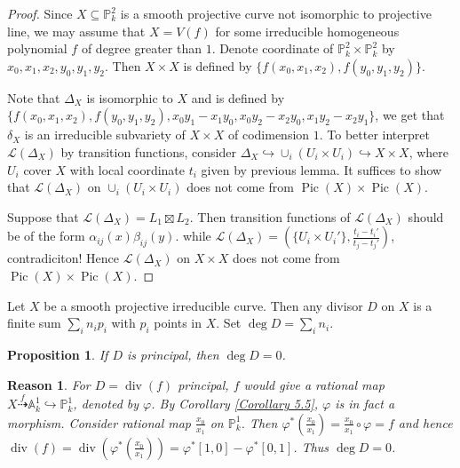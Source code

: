 \documentclass{ctexart}
\newtheorem{proposition}{Proposition}[section]
\newtheorem{reason}{Reason}[section]
\newcommand{\picardscheme}{\operatorname{Pic}}
\newcommand{\divisor}{\operatorname{div}}
\begin{document}
\begin{proof}
    Since $X \subseteq \mathbb{P}_{k}^{2}$ is a smooth projective curve not isomorphic to projective line,
    we may assume that $X = V(f)$ for some irreducible homogeneous polynomial $f$ of degree greater than $1$.
    Denote coordinate of $\mathbb{P}_{k}^{2} \times \mathbb{P}_{k}^{2}$ by $x_{0}, x_{1}, x_{2}, y_{0}, y_{1}, y_{2}$.
    Then $X \times X$ is defined by $\{f(x_{0}, x_{1}, x_{2}), f(y_{0}, y_{1}, y_{2})\}$.
    \par
    Note that $\Delta_{X}$ is isomorphic to $X$ and is defined by $\{f(x_{0}, x_{1}, x_{2}), f(y_{0}, y_{1}, y_{2}), x_{0}y_{1} - x_{1}y_{0}, x_{0}y_{2} - x_{2}y_{0}, x_{1}y_{2} - x_{2}y_{1}\}$,
    we get that $\delta_{X}$ is an irreducible subvariety of $X \times X$ of codimension $1$.
    To better interpret $\mathcal{L}(\Delta_{X})$ by transition functions, consider $\Delta_{X} \hookrightarrow \cup_{i} (U_{i} \times U_{i}) \hookrightarrow X \times X$,
    where $U_{i}$ cover $X$ with local coordinate $t_{i}$ given by previous lemma.
    It suffices to show that $\mathcal{L}(\Delta_{X})$ on $\cup_{i} (U_{i} \times U_{i})$ does not come from $\picardscheme (X) \times \picardscheme (X)$.
    \par
    Suppose that $\mathcal{L}(\Delta_{X}) = L_{1} \boxtimes L_{2}$.
    Then transition functions of $\mathcal{L}(\Delta_{X})$ should be of the form $\alpha_{ij}(x)\beta_{ij}(y)$.
    while $\mathcal{L}(\Delta_{X}) = (\{U_{i} \times U_{i}'\}, \frac{t_{i} - t_{i}'}{t_{j} - t_{j}'})$, contradiciton!
    Hence $\mathcal{L}(\Delta_{X})$ on $X \times X$ does not come from $\picardscheme (X) \times \picardscheme (X)$.
\end{proof}
Let $X$ be a smooth projective irreducible curve.
Then any divisor $D$ on $X$ is a finite sum $\sum_{i} n_{i}p_{i}$ with $p_{i}$ points in $X$.
Set $\deg D = \sum_{i} n_{i}$.
\begin{proposition}
    If $D$ is principal, then $\deg D = 0$.
    \label{Proposition 7.4}
\end{proposition}
\begin{reason}
    For $D = \divisor (f)$ principal, $f$ would give a rational map $X \overset{f}{\dashrightarrow} \mathbb{A}_{k}^{1} \hookrightarrow \mathbb{P}_{k}^{1}$, denoted by $\varphi$.
    By Corollary \ref{Corollary 5.5}, $\varphi$ is in fact a morphism.
    Consider rational map $\frac{x_{0}}{x_{1}}$ on $\mathbb{P}_{k}^{1}$.
    Then $\varphi^{\ast}(\frac{x_{0}}{x_{1}}) = \frac{x_{0}}{x_{1}} \circ \varphi = f$ and hence $\divisor (f) = \divisor (\varphi^{\ast}(\frac{x_{0}}{x_{1}})) = \varphi^{\ast}[1, 0] - \varphi^{\ast}[0, 1]$.
    Thus $\deg D = 0$.
\end{reason}
\end{document}
